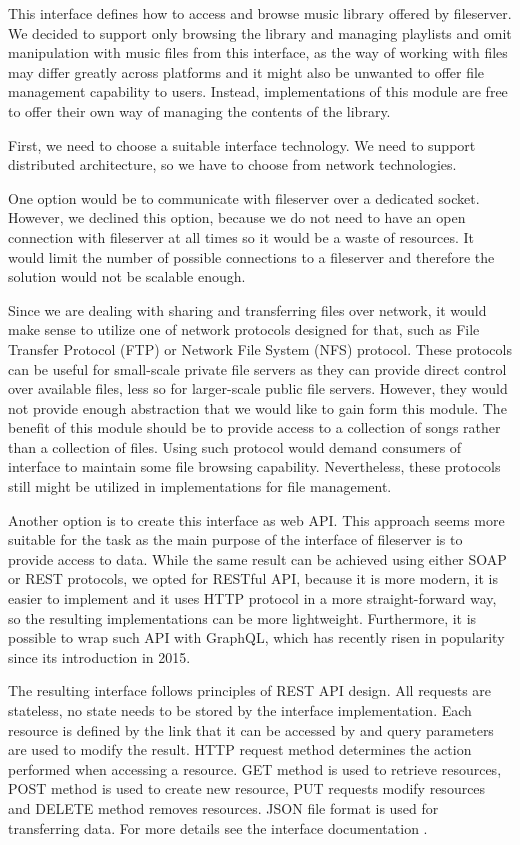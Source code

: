 This interface defines how to access and browse music library offered by fileserver. We decided to support only browsing the library and managing playlists and omit manipulation with music files from this interface, as the way of working with files may differ greatly across platforms and it might also be unwanted to offer file management capability to users. Instead, implementations of this module are free to offer their own way of managing the contents of the library.
\par
First, we need to choose a suitable interface technology. We need to support distributed architecture, so we have to choose from network technologies.
\par
One option would be to communicate with fileserver over a dedicated socket. However, we declined this option, because we do not need to have an open connection with fileserver at all times so it would be a waste of resources. It would limit the number of possible connections to a fileserver and therefore the solution would not be scalable enough.
\par
Since we are dealing with sharing and transferring files over network, it would make sense to utilize one of network protocols designed for that, such as File Transfer Protocol (FTP) or Network File System (NFS) protocol. These protocols can be useful for small-scale private file servers as they can provide direct control over available files, less so for larger-scale public file servers. However, they would not provide enough abstraction that we would like to gain form this module. The benefit of this module should be to provide access to a collection of songs rather than a collection of files. Using such protocol would demand consumers of interface to maintain some file browsing capability. Nevertheless, these protocols still might be utilized in implementations for file management.
\par
Another option is to create this interface as web API. This approach seems more suitable for the task as the main purpose of the interface of fileserver is to provide access to data. While the same result can be achieved using either SOAP or REST protocols, we opted for RESTful API, because it is more modern, it is easier to implement and it uses HTTP protocol in a more straight-forward way, so the resulting implementations can be more lightweight. Furthermore, it is possible to wrap such API with GraphQL, which has recently risen in popularity since its introduction in 2015.
\par
The resulting interface follows principles of REST API design. All requests are stateless, no state needs to be stored by the interface implementation. Each resource is defined by the link that it can be accessed by and query parameters are used to modify the result. HTTP request method determines the action performed when accessing a resource. GET method is used to retrieve resources, POST method is used to create new resource, PUT requests modify resources and DELETE method removes resources. JSON file format is used for transferring data. For more details see the interface documentation .

